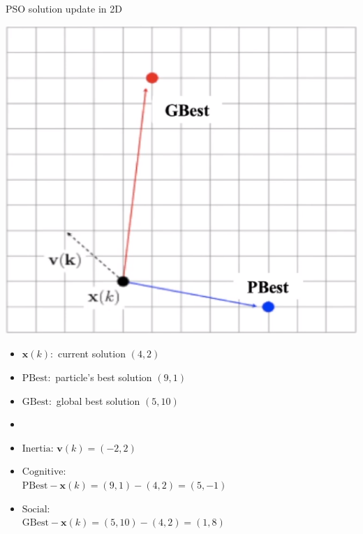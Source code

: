\documentclass[pdflatex,compress,mathserif]{beamer}
\begin{document}
\begin{frame}{PSO solution update in 2D}
	\begin{multicols}{2}
		\includegraphics[width=\linewidth]{img/12}
		\vfill\null
		\columnbreak
		\begin{itemize}
			\item[] \scriptsize{$\mathbf{x}(k):$ current solution $(4,2)$}
			\item[] \scriptsize{$\text{PBest}:$ particle's best solution $(9,1)$}
			\item[] \scriptsize{$\text{GBest}:$ global best solution $(5,10)$}
			\item[]
			\item[] \scriptsize{$\text{Inertia}$: $\mathbf{v}(k) = (-2,2)$}
			\item[] \scriptsize{$\text{Cognitive}$:\\
				$\text{PBest} - \mathbf{x}(k) = (9,1) - (4,2) = (5,-1)$}
			\item[] \scriptsize{$\text{Social}$:\\
				$\text{GBest} - \mathbf{x}(k) = (5,10) - (4,2) = (1,8)$}
		\end{itemize}
		\vfill\null
	\end{multicols}
\end{frame}
\end{document}
